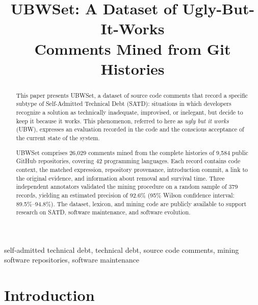 \documentclass[10pt,conference]{IEEEtran}
\begin{document}
\title{UBWSet: A Dataset of Ugly-But-It-Works\\ Comments Mined from Git Histories}

\author{
}

\maketitle

\begin{abstract}

This paper presents UBWSet, a dataset of source code comments that record a specific subtype of Self-Admitted Technical Debt (SATD): situations in which developers recognize a solution as technically inadequate, improvised, or inelegant, but decide to keep it because it works. This phenomenon, referred to here as \emph{ugly but it works} (UBW), expresses an evaluation recorded in the code and the conscious acceptance of the current state of the system.

UBWSet comprises 26,029 comments mined from the complete histories of 9,584 public GitHub repositories, covering 42 programming languages. Each record contains code context, the matched expression, repository provenance, introduction commit, a link to the original evidence, and information about removal and survival time. Three independent annotators validated the mining procedure on a random sample of 379 records, yielding an estimated precision of 92.6\% (95\% Wilson confidence interval: 89.5\%--94.8\%). The dataset, lexicon, and mining code are publicly available to support research on SATD, software maintenance, and software evolution.

\end{abstract}

\begin{IEEEkeywords}
self-admitted technical debt, technical debt, source code comments, mining software repositories, software maintenance
\end{IEEEkeywords}

\section{Introduction}
\label{sec:intro}
\end{document}
